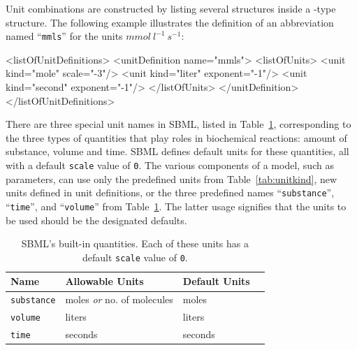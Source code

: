 \documentclass[10pt]{cekarticle}
\newenvironment{blockChanged}{\color{BrickRed}}{}
\begin{document}
Unit combinations are constructed by listing several 
structures inside a -type structure.  The following
example illustrates the definition of an abbreviation named
``\texttt{mmls}'' for the units $mmol\ l^{-1}\ s^{-1}$:

\begin{example}
<listOfUnitDefinitions>
    <unitDefinition name="mmls">
        <listOfUnits>
            <unit kind="mole"   scale="-3"/>
            <unit kind="liter"  exponent="-1"/>
            <unit kind="second" exponent="-1"/>
        </listOfUnits>                
    </unitDefinition>
</listOfUnitDefinitions>
\end{example}

\begin{blockChanged}
There are three special unit names in SBML, listed in
Table~\ref{tab:builtin}, corresponding to the three types of quantities
that play roles in biochemical reactions: amount of substance, volume and
time.  SBML defines default units for these quantities, all with a default
\texttt{scale} value of \texttt{0}.  The various components of a model,
such as parameters, can use only the predefined units from
Table~\ref{tab:unitkind}, new units defined in unit definitions, or the
three predefined names ``\texttt{substance}'', ``\texttt{time}'', and
``\texttt{volume}'' from Table~\ref{tab:builtin}.  The latter usage
signifies that the units to be used should be the designated defaults.  
\end{blockChanged}

\begin{table}[tb]
  \centering
  \small
  \setlength{\tabcolsep}{4.5pt}
  \begin{blockChanged}
  \begin{tabular}{lllc}
    \toprule
    \textbf{Name} & \textbf{Allowable Units} & \textbf{Default Units}\\
    \midrule
    \texttt{substance} & moles \emph{or} no. of molecules     & moles \\
    \texttt{volume}                & liters           & liters \\
    \texttt{time}                  & seconds          & seconds \\
    \bottomrule
  \end{tabular}
  \end{blockChanged}
  \caption{SBML's built-in quantities.  Each of these units has a default
  \texttt{scale} value of \texttt{0}.}
  \label{tab:builtin}
\end{table}
\end{document}
